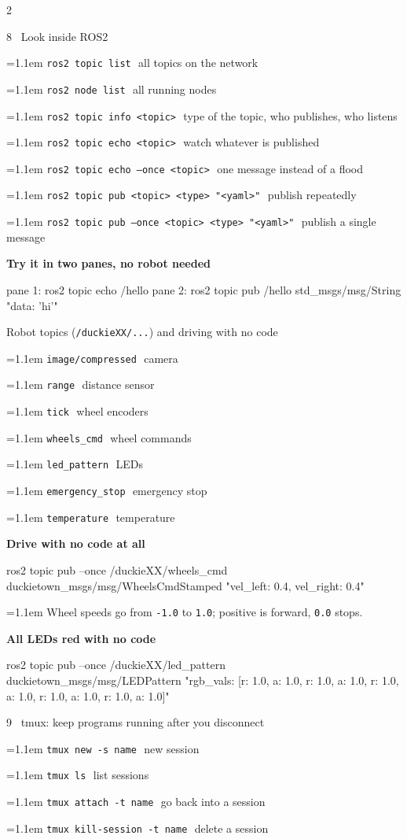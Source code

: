 \documentclass[10pt,a4paper]{extarticle}
\newcommand{\code}[1]{\textcolor{accentd}{\texttt{#1}}}
\newcommand{\ce}[2]{\par\hangindent=1.1em\hangafter=1
  \code{#1}\,\textcolor{dim}{\small\textemdash\ #2}\par\vspace{0.5pt}}
\newcommand{\nt}[1]{\par\hangindent=1.1em\hangafter=1
  \textcolor{dim}{\small #1}\par\vspace{0.5pt}}
\begin{document}
\begin{multicols}{2}
\begin{sect}{8 \ Look inside ROS2}
\ce{ros2 topic list}{all topics on the network}
\ce{ros2 node list}{all running nodes}
\ce{ros2 topic info <topic>}{type of the topic, who publishes, who listens}
\ce{ros2 topic echo <topic>}{watch whatever is published}
\ce{ros2 topic echo --once <topic>}{one message instead of a flood}
\ce{ros2 topic pub <topic> <type> "<yaml>"}{publish repeatedly}
\ce{ros2 topic pub --once <topic> <type> "<yaml>"}{publish a single message}
\vspace{2pt}
{\sffamily\bfseries\small\color{accent}Try it in two panes, no robot needed}\par\vspace{1pt}
\begin{cmd}
pane 1:  ros2 topic echo /hello
pane 2:  ros2 topic pub /hello std_msgs/msg/String "{data: 'hi'}"
\end{cmd}
\end{sect}

\begin{sect}{Robot topics (\texttt{/duckieXX/...}) and driving with no code}
\ce{image/compressed}{camera}
\ce{range}{distance sensor}
\ce{tick}{wheel encoders}
\ce{wheels\_cmd}{wheel commands}
\ce{led\_pattern}{LEDs}
\ce{emergency\_stop}{emergency stop}
\ce{temperature}{temperature}
\vspace{2pt}
{\sffamily\bfseries\small\color{accent}Drive with no code at all}\par\vspace{1pt}
\begin{cmd}
ros2 topic pub --once /duckieXX/wheels_cmd duckietown_msgs/msg/WheelsCmdStamped "{vel_left: 0.4, vel_right: 0.4}"
\end{cmd}
\nt{Wheel speeds go from \code{-1.0} to \code{1.0}; positive is forward, \code{0.0} stops.}
\vspace{1pt}
{\sffamily\bfseries\small\color{accent}All LEDs red with no code}\par\vspace{1pt}
\begin{cmd}
ros2 topic pub --once /duckieXX/led_pattern duckietown_msgs/msg/LEDPattern "{rgb_vals: [{r: 1.0, a: 1.0}, {r: 1.0, a: 1.0}, {r: 1.0, a: 1.0}, {r: 1.0, a: 1.0}, {r: 1.0, a: 1.0}]}"
\end{cmd}
\end{sect}

\begin{sect}{9 \ tmux: keep programs running after you disconnect}
\ce{tmux new -s name}{new session}
\ce{tmux ls}{list sessions}
\ce{tmux attach -t name}{go back into a session}
\ce{tmux kill-session -t name}{delete a session}
\end{sect}


\end{multicols}
\end{document}

